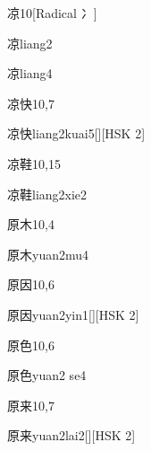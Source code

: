 \begin{entry}{凉}{10}[Radical 冫]
  \begin{phonetics}{凉}{liang2}
  \end{phonetics}
  \begin{phonetics}{凉}{liang4}
  \end{phonetics}
\end{entry}

\begin{entry}{凉快}{10,7}
  \begin{phonetics}{凉快}{liang2kuai5}[][HSK 2]
  \end{phonetics}
\end{entry}

\begin{entry}{凉鞋}{10,15}
  \begin{phonetics}{凉鞋}{liang2xie2}
  \end{phonetics}
\end{entry}

\begin{entry}{原木}{10,4}
  \begin{phonetics}{原木}{yuan2mu4}
  \end{phonetics}
\end{entry}

\begin{entry}{原因}{10,6}
  \begin{phonetics}{原因}{yuan2yin1}[][HSK 2]
  \end{phonetics}
\end{entry}

\begin{entry}{原色}{10,6}
  \begin{phonetics}{原色}{yuan2 se4}
  \end{phonetics}
\end{entry}

\begin{entry}{原来}{10,7}
  \begin{phonetics}{原来}{yuan2lai2}[][HSK 2]
  \end{phonetics}
\end{entry}

